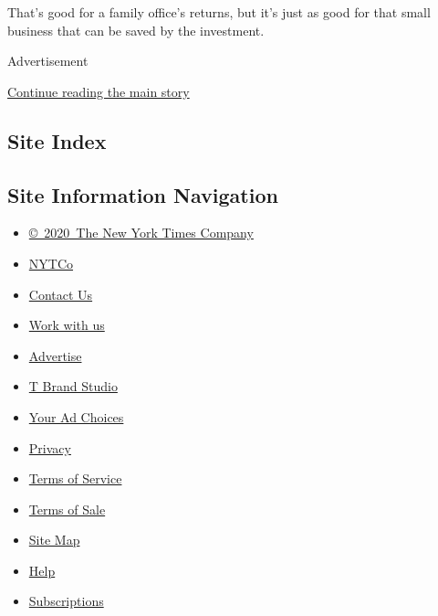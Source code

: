 That's good for a family office's returns, but it's just as good for
that small business that can be saved by the investment.

Advertisement

\protect\hyperlink{after-bottom}{Continue reading the main story}

\hypertarget{site-index}{%
\subsection{Site Index}\label{site-index}}

\hypertarget{site-information-navigation}{%
\subsection{Site Information
Navigation}\label{site-information-navigation}}

\begin{itemize}
\tightlist
\item
  \href{https://help.nytimes3xbfgragh.onion/hc/en-us/articles/115014792127-Copyright-notice}{©~2020~The
  New York Times Company}
\end{itemize}

\begin{itemize}
\tightlist
\item
  \href{https://www.nytco.com/}{NYTCo}
\item
  \href{https://help.nytimes3xbfgragh.onion/hc/en-us/articles/115015385887-Contact-Us}{Contact
  Us}
\item
  \href{https://www.nytco.com/careers/}{Work with us}
\item
  \href{https://nytmediakit.com/}{Advertise}
\item
  \href{http://www.tbrandstudio.com/}{T Brand Studio}
\item
  \href{https://www.nytimes3xbfgragh.onion/privacy/cookie-policy\#how-do-i-manage-trackers}{Your
  Ad Choices}
\item
  \href{https://www.nytimes3xbfgragh.onion/privacy}{Privacy}
\item
  \href{https://help.nytimes3xbfgragh.onion/hc/en-us/articles/115014893428-Terms-of-service}{Terms
  of Service}
\item
  \href{https://help.nytimes3xbfgragh.onion/hc/en-us/articles/115014893968-Terms-of-sale}{Terms
  of Sale}
\item
  \href{https://spiderbites.nytimes3xbfgragh.onion}{Site Map}
\item
  \href{https://help.nytimes3xbfgragh.onion/hc/en-us}{Help}
\item
  \href{https://www.nytimes3xbfgragh.onion/subscription?campaignId=37WXW}{Subscriptions}
\end{itemize}
